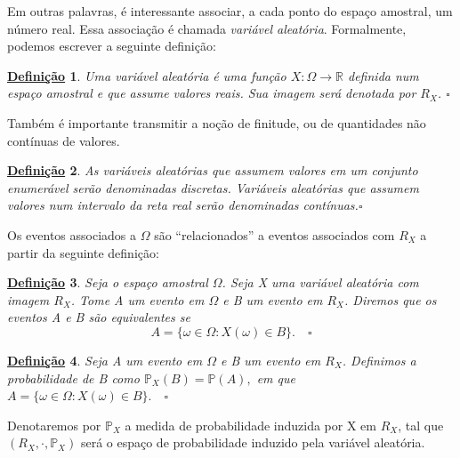 \documentclass{article}
\newtheorem*{def*}{\underline{Defini\c c\~ao}}
\begin{document}
  Em outras palavras, é interessante associar, a cada ponto do espaço amostral, um número real. Essa associação é
chamada \textit{variável aleatória}. Formalmente, podemos escrever a seguinte definição:
\begin{def*}
  Uma variável aleatória é uma função \(X:\Omega \rightarrow \mathbb{R}\) definida num espaço amostral e que assume valores reais.
Sua imagem será denotada por \(R_{X}\). \(\square\)
\end{def*}
  Também é importante transmitir a noção de finitude, ou de quantidades não contínuas de valores.
 \begin{def*}
   As variáveis aleatórias que assumem valores em um conjunto enumerável serão denominadas discretas. Variáveis aleatórias que assumem valores
num intervalo da reta real serão denominadas contínuas.\(\square\)
 \end{def*}
  Os eventos associados a \(\Omega \) são ``relacionados'' a eventos associados com \(R_{X}\) a partir 
da seguinte definição:
\begin{def*}
  Seja o espaço amostral \(\Omega \). Seja X uma variável aleatória com imagem \(R_{X}\). Tome A
um evento em \(\Omega \) e B um evento em \(R_{X}\). Diremos que os eventos A e B são equivalentes se 
  \[
    A = \{\omega \in \Omega : X(\omega )\in B\}.\quad\square
  \]
\end{def*}
\begin{def*}
  Seja A um evento em \(\Omega \) e B um evento em \(R_{X}\). Definimos a probabilidade de B como
 \(\mathbb{P}_{X}(B) = \mathbb{P}(A),\) em que \(A = \{\omega \in \Omega : X(\omega )\in B\}.\quad\square\)
\end{def*}
  Denotaremos por \(\mathbb{P}_{X}\) a medida de probabilidade induzida por X em \(R_{X}\), tal que \((R_{X}, \cdot , \mathbb{P}_{X})\) será o espaço
de probabilidade induzido pela variável aleatória.
\end{document}
